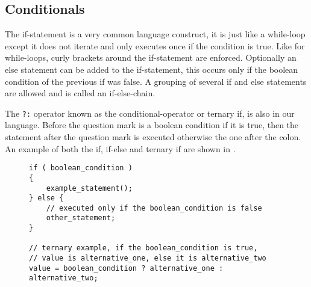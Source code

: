 \subsection{Conditionals}
The if-statement is a very common language construct, it is just like a while-loop except it does not iterate and only executes once if the condition is true.
Like for while-loops, curly brackets around the if-statement are enforced. 
Optionally an else statement can be added to the if-statement, this occurs only if the boolean condition of the previous if was false. 
A grouping of several if and else statements are allowed and is called an if-else-chain. 

The \texttt{?:} operator known as the conditional-operator or ternary if, is also in our language. 
Before the question mark is a boolean condition if it is true, then the statement after the question mark is executed otherwise the one after the colon. 
An example of both the if, if-else and ternary if are shown in .
\begin{figure}[h]
\begin{lstlisting}[caption=An example of the conditional operators., label=lst:condExample]
if ( boolean_condition )
{
    example_statement();
} else {
    // executed only if the boolean_condition is false
    other_statement;
}

// ternary example, if the boolean_condition is true,
// value is alternative_one, else it is alternative_two
value = boolean_condition ? alternative_one : alternative_two;

\end{lstlisting}
\end{figure}
